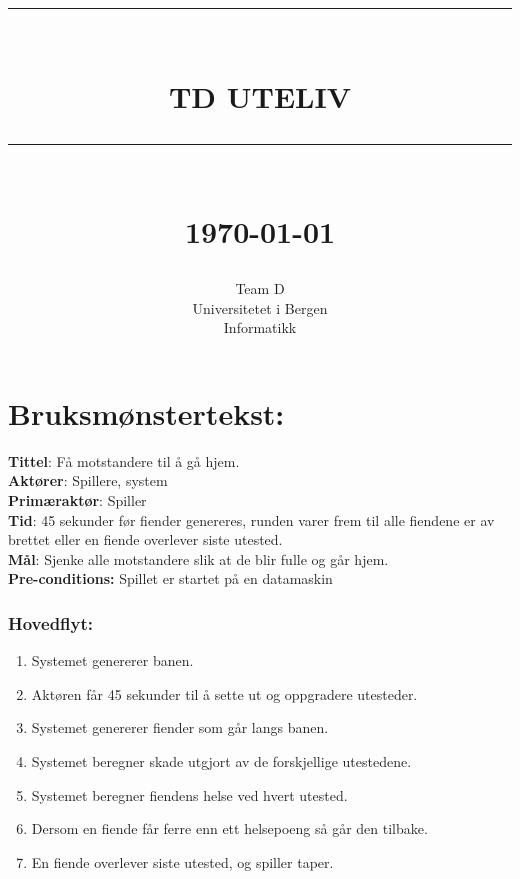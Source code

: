 \documentclass[12pt]{report}
\newcommand{\HRule}[1]{\rule{\linewidth}{#1}}
\begin{document}
\title{ \normalsize \textsc{}
		\\ [2.0cm]
		\HRule{0.5pt} \\
		\LARGE \textbf{\uppercase{TD Uteliv }}
		\HRule{2pt} \\ [0.5cm]
		\normalsize \today \vspace*{5\baselineskip}}
\date{}
\author{
		Team D  \\ 
		Universitetet i Bergen \\
		Informatikk }
\maketitle
\tableofcontents
\newpage
\section*{Bruksm{\o}nstertekst:}
\textbf{Tittel}: Få motstandere til å gå hjem.
\bigskip \\
\textbf{Akt{\o}rer}: Spillere, system
\bigskip \\
\textbf{Prim{\ae}rakt{\o}r}: Spiller
\bigskip \\
\textbf{Tid}: 45 sekunder før fiender genereres, runden varer frem til alle fiendene er av brettet eller en fiende overlever siste utested. 
\bigskip \\
\textbf{M{\aa}l}: Sjenke alle motstandere slik at de blir fulle og går hjem. 
\bigskip \\
\textbf{Pre-conditions:} Spillet er startet p{\aa} en datamaskin
\subsubsection*{Hovedflyt:}
\begin{enumerate}
\item Systemet genererer banen. 
\item Aktøren får 45 sekunder til å sette ut og oppgradere utesteder. 
\item Systemet genererer fiender som går langs banen. 
\item Systemet beregner skade utgjort av de forskjellige utestedene. 
\item Systemet beregner fiendens helse ved hvert utested.  
\item Dersom en fiende får ferre enn ett helsepoeng så går den tilbake.  
\item En fiende overlever siste utested, og spiller taper. 
\end{enumerate}
\end{document}

